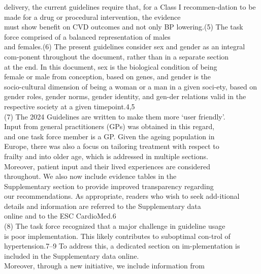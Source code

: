 \documentclass[bs, english]{stthesis}
\begin{document}
delivery, the current guidelines require that, for a Class I recommen-dation to be made for a drug or procedural intervention, the evidence\\
must show benefit on CVD outcomes and not only BP lowering.(5) The  task  force  comprised  of  a  balanced  representation  of  males\\
and females.(6) The present guidelines consider sex and gender as an integral com-ponent throughout the document, rather than in a separate section\\
at the end. In this document, sex is the biological condition of being\\
female or male from conception, based on genes, and gender is the\\
socio-cultural dimension of being a woman or a man in a given soci-ety, based on gender roles, gender norms, gender identity, and gen-der relations valid in the respective society at a given timepoint.4,5\\
(7) The  2024  Guidelines  are  written  to  make  them  more  ‘user  friendly’.\\
Input  from  general  practitioners  (GPs)  was  obtained  in  this  regard,\\
and  one  task  force  member  is  a  GP.  Given  the  ageing  population  in\\
Europe, there was also a focus on tailoring treatment with respect to\\
frailty  and  into  older  age,  which  is  addressed  in  multiple  sections.\\
Moreover,  patient  input  and  their  lived  experiences  are  considered\\
throughout.  We  also  now  include  evidence  tables  in  the\\
Supplementary  section  to  provide  improved  transparency  regarding\\
our recommendations. As appropriate, readers who wish to seek add-itional details and information are referred to the Supplementary data\\
online and to the  ESC CardioMed.6\\
(8) The task force recognized that a major challenge in guideline usage\\
is poor implementation. This likely contributes to suboptimal con-trol of hypertension.7–9 To address this, a dedicated section on im-plementation  is  included  in  the  Supplementary  data  online.\\
Moreover, through a new initiative, we include information from\\
\end{document}
